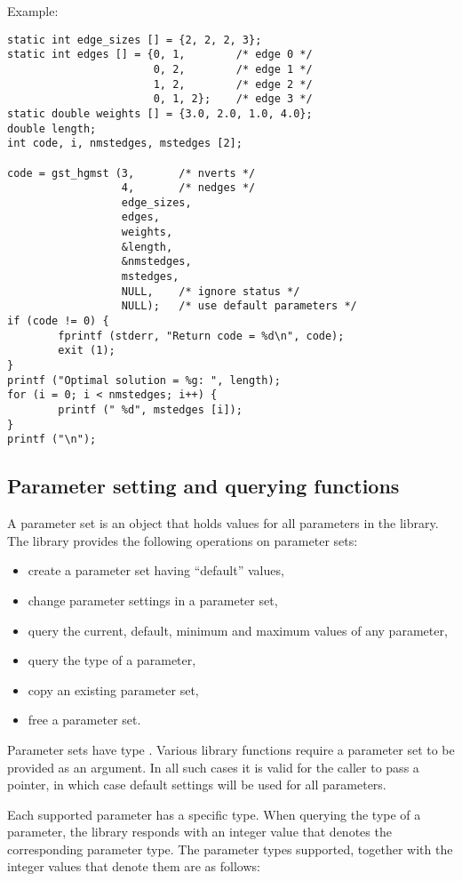 \bigskip{}Example:
{\footnotesize
\begin{verbatim}
static int edge_sizes [] = {2, 2, 2, 3};
static int edges [] = {0, 1,        /* edge 0 */
                       0, 2,        /* edge 1 */
                       1, 2,        /* edge 2 */
                       0, 1, 2};    /* edge 3 */
static double weights [] = {3.0, 2.0, 1.0, 4.0};
double length;
int code, i, nmstedges, mstedges [2];

code = gst_hgmst (3,       /* nverts */
                  4,       /* nedges */
                  edge_sizes,
                  edges,
                  weights,
                  &length,
                  &nmstedges,
                  mstedges,
                  NULL,    /* ignore status */
                  NULL);   /* use default parameters */
if (code != 0) {
        fprintf (stderr, "Return code = %d\n", code);
        exit (1);
}
printf ("Optimal solution = %g: ", length);
for (i = 0; i < nmstedges; i++) {
        printf (" %d", mstedges [i]);
}
printf ("\n");
\end{verbatim}
}
\clearpage\subsection{Parameter setting and querying functions}
\label{parameter_functions}
A parameter set is an object that holds values for all parameters in the
library.
The library provides the following operations on parameter sets:
\begin{itemize}
  \item create a parameter set having ``default'' values,
  \item change parameter settings in a parameter set,
  \item query the current, default, minimum and maximum values
        of any parameter,
  \item query the type of a parameter,
  \item copy an existing parameter set,
  \item free a parameter set.
\end{itemize}
Parameter sets have type . Various library
functions require a parameter set to be provided as 
an argument. In all such cases it is valid for the caller to pass a
 pointer, in which case default settings will be used for all
parameters.

Each supported parameter has a specific type.  When querying the type of
a parameter, the library responds with an integer value that denotes the
corresponding parameter type.  The parameter types supported, together
with the integer values that denote them are as follows:

